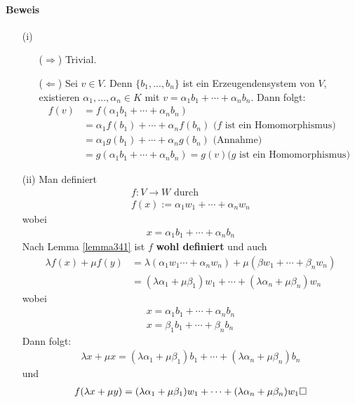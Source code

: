 \documentclass[11pt]{report}
\newcommand*\f[1] {\textbf{#1}}
\begin{document}
\paragraph{Beweis}
\begin{itemize}
 \item[(i)] 
\begin{itemize}
\item[($\Rightarrow$)] Trivial.
\item[($\Leftarrow$)] Sei $v \in V$. Denn $\{b_1, ..., b_n\}$ ist ein Erzeugendensystem von $V$, existieren $\alpha_1, ..., \alpha_n \in K$ mit $v = \alpha_1 b_1 + \cdots + \alpha_n b_n$. Dann folgt:
\begin{align}
 f(v) &= f(\alpha_1 b_1 + \cdots + \alpha_n b_n) \\
 &= \alpha_1 f(b_1) + \cdots +\alpha_n f(b_n) \text{ ($f$ ist ein Homomorphismus)} \\
 &= \alpha_1g(b_1) + \cdots + \alpha_n g(b_n) \text{ (Annahme)} \\
 &= g(\alpha_1 b_1 + \cdots + \alpha_n b_n ) = g(v) \text{($g$ ist ein Homomorphismus)}
\end{align}
\end{itemize}
 \item[(ii)] Man definiert
\begin{align}
 f: V \rightarrow W \text{ durch} \\
 f(x):= \alpha_1 w_1 + \cdots + \alpha_n w_n
\end{align}
wobei
\begin{align}
 x = \alpha_1 b_1 + \cdots + \alpha_n b_n
\end{align}
Nach Lemma \ref{lemma341} ist $f$ \f{wohl definiert} und auch 
\begin{align}
 \lambda f(x) + \mu f(y) &= \lambda(\alpha_1 w_1 \cdots + \alpha_n w_n)+ \mu (\beta w_1 + \cdots + \beta_n w_n) \\
 &= (\lambda \alpha_1 + \mu \beta_1) w_1 + \cdots + (\lambda \alpha_n + \mu \beta_n) w_n
\end{align}
wobei 
\begin{align}
 x = \alpha_1 b_1 + \cdots + \alpha_n b_n \\
 x = \beta_1 b_1 + \cdots + \beta_n b_n 
\end{align}
Dann folgt:
\begin{align}
 \lambda x + \mu x = (\lambda \alpha_1 + \mu \beta_1) b_1 + \cdots + (\lambda \alpha_n + \mu\beta_n) b_n
\end{align}
und
\begin{align}
 f(\lambda x + \mu y) = (\lambda \alpha_1 + \mu \beta_1) w_1 + \cdots + (\lambda \alpha_n + \mu \beta_n) w_1 \hfill\Box
\end{align}
\end{itemize}
\end{document}
